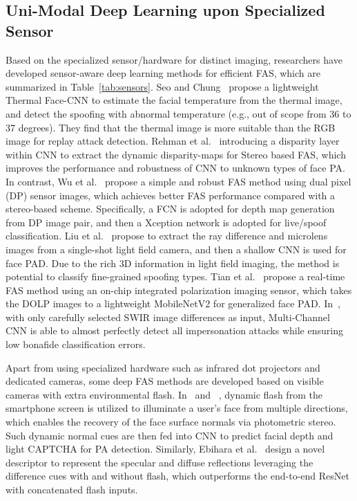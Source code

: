 \documentclass[10pt,journal,compsoc]{IEEEtran}
\begin{document}
\vspace{-0.5em}

\subsection{Uni-Modal Deep Learning upon Specialized Sensor}
Based on the specialized sensor/hardware for distinct imaging, researchers have developed sensor-aware deep learning methods for efficient FAS, which are summarized in Table~\ref{tab:sensors}. Seo and Chung~\cite{seo2019face} propose a lightweight Thermal Face-CNN to estimate the facial temperature from the thermal image, and detect the spoofing with abnormal temperature (e.g., out of scope from 36 to 37 degrees). They find that the thermal image is more suitable than the RGB image for replay attack detection. Rehman et al.~\cite{rehman2020slnet} introducing a disparity layer within CNN to extract the dynamic disparity-maps for Stereo based FAS, which improves the performance and robustness of CNN to unknown types of face PA. In contrast, Wu et al.~\cite{wu2020single} propose a simple and robust FAS method using dual pixel (DP) sensor images, which achieves better FAS performance compared with a stereo-based scheme. Specifically, a FCN is adopted for depth map generation from DP image pair, and then a Xception network is adopted for live/spoof classification. Liu et al.~\cite{liu2019light} propose to extract the ray difference and microlens images from a single-shot light field camera, and then a shallow CNN is used for face PAD. Due to the rich 3D information in light field imaging, the method is potential to classify fine-grained spoofing types. Tian et al.~\cite{tian2020face} propose a real-time FAS method using an on-chip integrated polarization imaging sensor, which takes the DOLP images to a lightweight MobileNetV2 for generalized face PAD. In~\cite{heusch2020deep}, with only carefully selected SWIR image differences as input, Multi-Channel CNN is able to almost perfectly detect all impersonation attacks while ensuring low bonafide classification errors.


Apart from using specialized hardware such as infrared dot projectors and dedicated cameras, some deep FAS methods are developed based on visible cameras with extra environmental flash. In~\cite{liu2019AuroraGuard} and ~\cite{farrukh2020facerevelio}, dynamic flash from the smartphone screen is utilized to illuminate a user’s face from multiple directions, which enables the recovery of the face surface normals via photometric stereo. Such dynamic normal cues are then fed into CNN to predict facial depth and light CAPTCHA for PA detection. Similarly, Ebihara et al.~\cite{ebihara2019specular} design a novel descriptor to represent the specular and diffuse reflections leveraging the difference cues with and without flash, which outperforms the end-to-end ResNet with concatenated flash inputs. 
\end{document}
